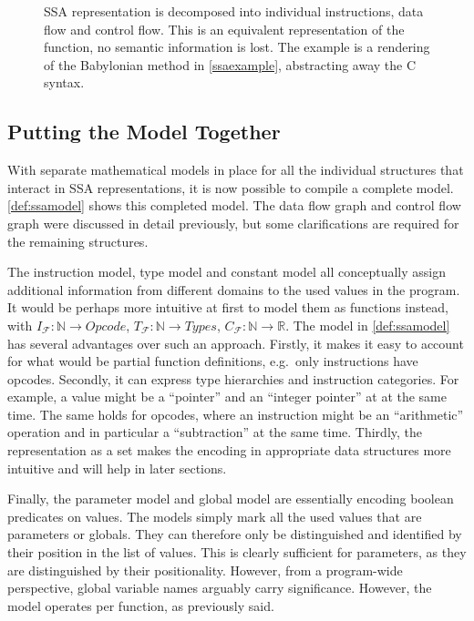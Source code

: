 \begin{figure}[p]

\caption{SSA representation is decomposed into individual instructions, data
         flow and control flow.
         This is an equivalent representation of the function, no semantic
         information is lost.
         The example is a rendering of the Babylonian method in
         \autoref{ssaexample}, abstracting away the C syntax.}
\label{fig:separation}
\end{figure}

\subsection{Putting the Model Together}

\begin{figure}[p]
    
\end{figure}

    With separate mathematical models in place for all the individual structures
    that interact in SSA representations, it is now possible to compile a
    complete model.
    \autoref{def:ssamodel} shows this completed model.
    The data flow graph and control flow graph were discussed in detail
    previously, but some clarifications are required for the remaining
    structures.

    The instruction model, type model and constant model all conceptually assign
    additional information from different domains to the used values in the
    program.
    It would be perhaps more intuitive at first to model them as functions
    instead, with $I_\mathcal F\colon\mathbb N\rightarrow Opcode$,
    $T_\mathcal F\colon\mathbb N\rightarrow Types$,
    $C_\mathcal F\colon\mathbb N\rightarrow \mathbb R$.
    The model in \autoref{def:ssamodel} has several advantages over such an
    approach.
    Firstly, it makes it easy to account for what would be partial function
    definitions, e.g.\ only instructions have opcodes.
    Secondly, it can express type hierarchies and instruction categories.
    For example, a value might be a ``pointer'' and an ``integer pointer'' at
    at the same time.
    The same holds for opcodes, where an instruction might be an ``arithmetic''
    operation and in particular a ``subtraction'' at the same time.
    Thirdly, the representation as a set makes the encoding in appropriate data
    structures more intuitive and will help in later sections.

    Finally, the parameter model and global model are essentially encoding
    boolean predicates on values.
    The models simply mark all the used values that are parameters or globals.
    They can therefore only be distinguished and identified by their position
    in the list of values.
    This is clearly sufficient for parameters, as they are distinguished by
    their positionality.
    However, from a program-wide perspective, global variable names arguably
    carry significance.
    However, the model operates per function, as previously said.

